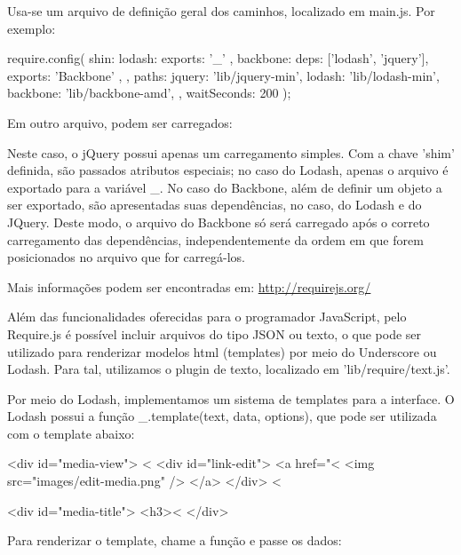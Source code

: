 Usa-se um arquivo de definição geral dos caminhos, localizado em main.js. Por exemplo:
\begin{code}
require.config({
    shin: {
	lodash: { 
	    exports: '_'
	},
	backbone: {
	    deps: ['lodash', 'jquery'],
	    exports: 'Backbone'
	},
    },
    paths: {
	jquery: 'lib/jquery-min',
	lodash: 'lib/lodash-min',
	backbone: 'lib/backbone-amd',
    },
    waitSeconds: 200
});

\end{code}

Em outro arquivo, podem ser carregados:


Neste caso, o jQuery possui apenas um carregamento simples. Com a chave
'shim' definida, são passados atributos especiais; no caso do Lodash,
apenas o arquivo é exportado para a variável \_. No caso do Backbone,
além de definir um objeto a ser exportado, são apresentadas suas dependências,
no caso, do Lodash e do JQuery. Deste modo, o arquivo do Backbone só será
carregado após o correto carregamento das dependências, independentemente
da ordem em que forem posicionados no arquivo que for carregá-los.

Mais informações podem ser encontradas em: \url{http://requirejs.org/}

Além das funcionalidades oferecidas para o programador JavaScript, pelo Require.js
é possível incluir arquivos do tipo JSON ou texto, o que pode ser utilizado para
renderizar modelos html (templates) por meio do Underscore ou Lodash. Para tal,
utilizamos o plugin de texto, localizado em 'lib/require/text.js'.

Por meio do Lodash, implementamos um sistema de templates para a interface. O
Lodash possui a função \_.template(text, data, options), que pode ser utilizada
com o template abaixo:

\begin{code}
  <div id="media-view">
  <%
  <div id="link-edit">
    <a href="<%
      <img src="images/edit-media.png" />
    </a>
  </div>
  <%

  <div id="media-title">
      <h3><%
  </div>
\end{code}

Para renderizar o template, chame a função e passe os dados:

